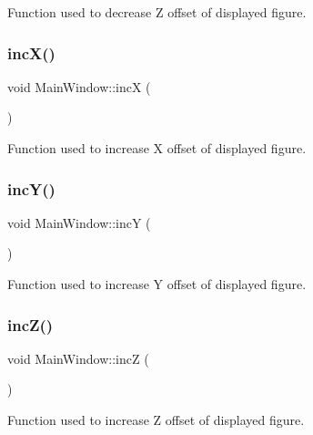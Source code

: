 Function used to decrease Z offset of displayed figure. 

\mbox{\label{classMainWindow_a6ae88293630f79a3ccb75bc5e64daea5}} 
\subsubsection{\texorpdfstring{inc\+X()}{incX()}}
{\footnotesize\ttfamily void Main\+Window\+::incX (\begin{DoxyParamCaption}{ }\end{DoxyParamCaption})}



Function used to increase X offset of displayed figure. 

\mbox{\label{classMainWindow_ad4fa62f605231f2c935f37f7a204bbf9}} 
\subsubsection{\texorpdfstring{inc\+Y()}{incY()}}
{\footnotesize\ttfamily void Main\+Window\+::incY (\begin{DoxyParamCaption}{ }\end{DoxyParamCaption})}



Function used to increase Y offset of displayed figure. 

\mbox{\label{classMainWindow_a25ae6019ab87c5e9bf844ac007b00249}} 
\subsubsection{\texorpdfstring{inc\+Z()}{incZ()}}
{\footnotesize\ttfamily void Main\+Window\+::incZ (\begin{DoxyParamCaption}{ }\end{DoxyParamCaption})}



Function used to increase Z offset of displayed figure. 

\mbox{\label{classMainWindow_a9c8748d463f01ddae6abcd8f8163fcef}} 
